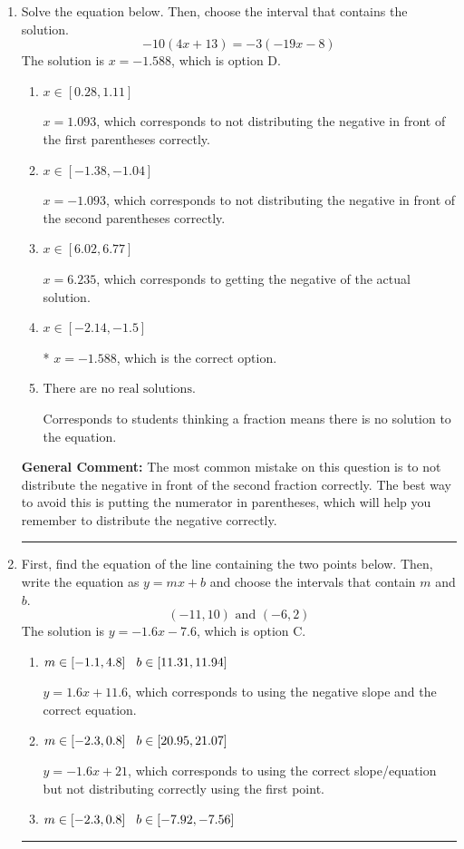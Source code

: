 \documentclass{extbook}[14pt]
\newcommand{\litem}[1]{\item #1

\rule{\textwidth}{0.4pt}}
\begin{document}
\begin{enumerate}\litem{
Solve the equation below. Then, choose the interval that contains the solution.
\[ -10(4x + 13) = -3(-19x -8) \]The solution is \( x = -1.588 \), which is option D.\begin{enumerate}[label=\Alph*.]
\item \( x \in [0.28, 1.11] \)

$x = 1.093$, which corresponds to not distributing the negative in front of the first parentheses correctly.
\item \( x \in [-1.38, -1.04] \)

$x = -1.093$, which corresponds to not distributing the negative in front of the second parentheses correctly.
\item \( x \in [6.02, 6.77] \)

$x = 6.235$, which corresponds to getting the negative of the actual solution.
\item \( x \in [-2.14, -1.5] \)

* $x = -1.588$, which is the correct option.
\item \( \text{There are no real solutions.} \)

Corresponds to students thinking a fraction means there is no solution to the equation.
\end{enumerate}

\textbf{General Comment:} The most common mistake on this question is to not distribute the negative in front of the second fraction correctly. The best way to avoid this is putting the numerator in parentheses, which will help you remember to distribute the negative correctly.
}
\litem{
First, find the equation of the line containing the two points below. Then, write the equation as $ y=mx+b $ and choose the intervals that contain $m$ and $b$.
\[ (-11, 10) \text{ and } (-6, 2) \]The solution is \( y = -1.6x -7.6 \), which is option C.\begin{enumerate}[label=\Alph*.]
\item \( m \in [-1.1, 4.8] \hspace*{3mm} b \in [11.31, 11.94] \)

 $y = 1.6x + 11.6$, which corresponds to using the negative slope and the correct equation.
\item \( m \in [-2.3, 0.8] \hspace*{3mm} b \in [20.95, 21.07] \)

 $y = -1.6x + 21$, which corresponds to using the correct slope/equation but not distributing correctly using the first point.
\item \( m \in [-2.3, 0.8] \hspace*{3mm} b \in [-7.92, -7.56] \)


\end{enumerate}}
\end{enumerate}
\end{document}
